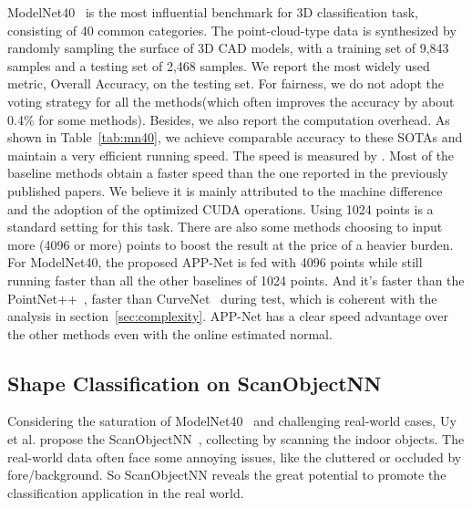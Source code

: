 \documentclass[journal]{IEEEtran}
\begin{document}
ModelNet40~\cite{wu20153d} is the most influential benchmark for 3D classification task, consisting of 40 common categories. The point-cloud-type data is synthesized by randomly sampling the surface of 3D CAD models, with a training set of 9,843 samples and a testing set of 2,468 samples. We report the most widely used metric, Overall Accuracy, on the testing set. For fairness, we do not adopt the voting strategy for all the methods(which often improves the accuracy by about 0.4\% for some methods). Besides, we also report the computation overhead. As shown in Table~\ref{tab:mn40}, we achieve comparable accuracy to these SOTAs and maintain a very efficient running speed. The speed is measured by . Most of the baseline methods obtain a faster speed than the one reported in the previously published papers. We believe it is mainly attributed to the machine difference and the adoption of the optimized CUDA operations. Using 1024 points is a standard setting for this task. There are also some methods choosing to input more (4096 or more) points to boost the result at the price of a heavier burden. For ModelNet40, the proposed APP-Net is fed with 4096 points while still running faster than all the other baselines of 1024 points. And it's {\bf } faster than the PointNet++~\cite{PointNet++}, {\bf } faster than CurveNet~\cite{muzahid2020curvenet} during test, which is coherent with the analysis in section~\ref{sec:complexity}. APP-Net has a clear speed advantage over the other methods even with the online estimated normal. 


                                                                      

\subsection{Shape Classification on ScanObjectNN}



Considering the saturation of ModelNet40~\cite{wu20153d} and challenging real-world cases, Uy et al. propose the ScanObjectNN~\cite{uy2019revisiting}, collecting by scanning the indoor objects. The real-world data often face some annoying issues, like the cluttered or occluded by fore/background. So ScanObjectNN reveals the great potential to promote the classification application in the real world. 
\end{document}
